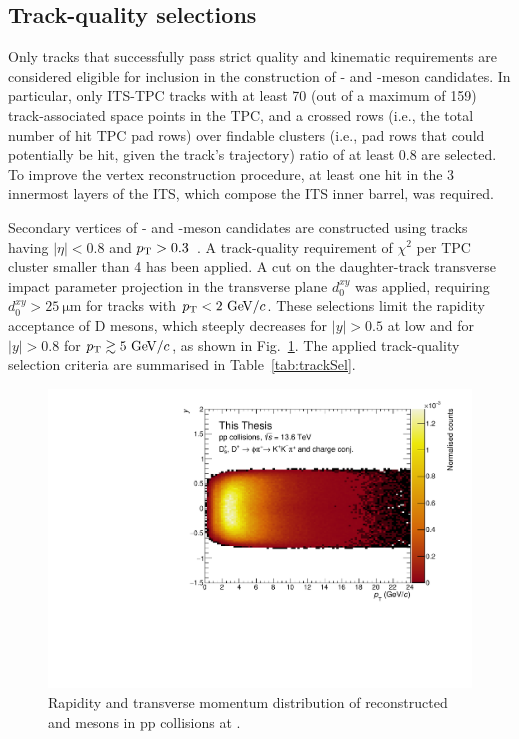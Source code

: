\subsection{Track-quality selections}
Only tracks that successfully pass strict quality and kinematic requirements are considered eligible for inclusion in the construction of \ds- and \dpl-meson candidates. In particular, only ITS-TPC tracks with at least 70 (out of a maximum of 159) track-associated space points in the TPC, and a crossed rows (i.e., the total number of hit TPC pad rows) over findable clusters (i.e., pad rows that could potentially be hit, given the track's trajectory) ratio of at least 0.8 are selected. To improve the vertex reconstruction procedure, at least one hit in the 3 innermost layers of the ITS, which compose the ITS inner barrel, was required.

Secondary vertices of \ds- and \dpl-meson candidates are constructed using tracks having $\lvert\eta\rvert < 0.8$ and $p_\mathrm{T} > 0.3$~\gevc. A track-quality requirement of $\chi^2$ per TPC cluster smaller than 4 has been applied. A cut on the daughter-track transverse impact parameter projection in the transverse plane $d_0^{xy}$ was applied, requiring \mbox{$d_0^{xy} > \SI{25}{\micro\meter}$} for tracks with $p_\mathrm{T} < 2~\mathrm{Ge\kern-.1emV}/c $. These selections limit the rapidity acceptance of D mesons, which steeply decreases for $\lvert y\rvert > 0.5$ at low \pt and for $\lvert y\rvert > 0.8$ for $p_\mathrm{T} \gtrsim 5~\mathrm{Ge\kern-.1emV}/c$, as shown in Fig.~\ref{fig:RapidityAcceptance}. The applied track-quality selection criteria are summarised in Table~\ref{tab:trackSel}.

\begin{figure}[htb]
    \centering
    \includegraphics[width=0.7\linewidth]{Figures/Chapter 4/PtVsY.pdf}
    \caption{Rapidity and transverse momentum distribution of reconstructed \ds and \dpl mesons in pp collisions at \thirteen.}
    \label{fig:RapidityAcceptance}
\end{figure}

